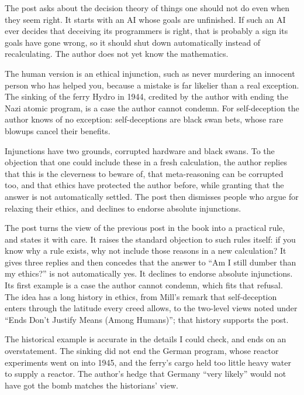 \begin{afterword}
\summaryhead

The post asks about the decision theory of things one should not do even when they seem right. It starts with an AI whose goals are unfinished. If such an AI ever decides that deceiving its programmers is right, that is probably a sign its goals have gone wrong, so it should shut down automatically instead of recalculating. The author does not yet know the mathematics.

The human version is an ethical injunction, such as never murdering an innocent person who has helped you, because a mistake is far likelier than a real exception. The sinking of the ferry Hydro in 1944, credited by the author with ending the Nazi atomic program, is a case the author cannot condemn. For self-deception the author knows of no exception: self-deceptions are black swan bets, whose rare blowups cancel their benefits.

Injunctions have two grounds, corrupted hardware and black swans. To the objection that one could include these in a fresh calculation, the author replies that this is the cleverness to beware of, that meta-reasoning can be corrupted too, and that ethics have protected the author before, while granting that the answer is not automatically settled. The post then dismisses people who argue for relaxing their ethics, and declines to endorse absolute injunctions.

\responsehead

The post turns the view of the previous post in the book into a practical rule, and states it with care. It raises the standard objection to such rules itself: if you know why a rule exists, why not include those reasons in a new calculation? It gives three replies and then concedes that the answer to ``Am I still dumber than my ethics?'' is not automatically yes. It declines to endorse absolute injunctions. Its first example is a case the author cannot condemn, which fits that refusal. The idea has a long history in ethics, from Mill's remark that self-deception enters through the latitude every creed allows, to the two-level views noted under ``Ends Don't Justify Means (Among Humans)''; that history supports the post.

The historical example is accurate in the details I could check, and ends on an overstatement. The sinking did not end the German program, whose reactor experiments went on into 1945, and the ferry's cargo held too little heavy water to supply a reactor. The author's hedge that Germany ``very likely'' would not have got the bomb matches the historians' view.


\end{afterword}
